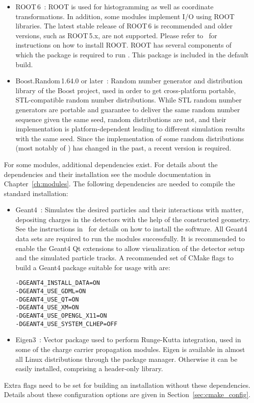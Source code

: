 \begin{itemize}
\item ROOT\,6~\cite{root}:
ROOT is used for histogramming as well as coordinate transformations.
In addition, some modules implement I/O using ROOT libraries.
The latest stable release of ROOT\,6 is recommended and older versions, such as ROOT\,5.x, are not supported.
Please refer to~\cite{rootinstallation} for instructions on how to install ROOT.
ROOT has several components of which the  package is required to run \apsq.
This package is included in the default build.
\item Boost.Random\,1.64.0 or later~\cite{boostrandom}:
Random number generator and distribution library of the Boost project, used in order to get cross-platform portable, STL-compatible random number distributions.
While STL random number generators are portable and guarantee to deliver the same random number sequence given the same seed, random distributions are not, and their implementation is platform-dependent leading to different simulation results with the same seed.
Since the implementation of some random distributions (most notably of ) has changed in the past, a recent version is required.
\end{itemize}

For some modules, additional dependencies exist.
For details about the dependencies and their installation see the module documentation in Chapter~\ref{ch:modules}.
The following dependencies are needed to compile the standard installation:
\begin{itemize}
\item Geant4~\cite{geant4}: Simulates the desired particles and their interactions with matter, depositing charges in the detectors with the help of the constructed geometry.
See the instructions in~\cite{geant4installation} for details on how to install the software.
All Geant4 data sets are required to run the modules successfully.
It is recommended to enable the Geant4 Qt extensions to allow visualization of the detector setup and the simulated particle tracks.
A recommended set of CMake flags to build a Geant4 package suitable for usage with \apsq are:
\begin{verbatim}
-DGEANT4_INSTALL_DATA=ON
-DGEANT4_USE_GDML=ON
-DGEANT4_USE_QT=ON
-DGEANT4_USE_XM=ON
-DGEANT4_USE_OPENGL_X11=ON
-DGEANT4_USE_SYSTEM_CLHEP=OFF
\end{verbatim}
\item Eigen3~\cite{eigen3}: Vector package used to perform Runge-Kutta integration, used in some of the charge carrier propagation modules.
Eigen is available in almost all Linux distributions through the package manager.
Otherwise it can be easily installed, comprising a header-only library.
\end{itemize}
Extra flags need to be set for building an \apsq installation without these dependencies.
Details about these configuration options are given in Section~\ref{sec:cmake_config}.

